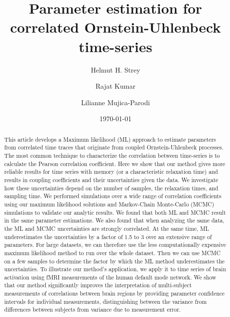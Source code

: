 \documentclass[%
 reprint,
 amsmath,amssymb,
 aps,
]{revtex4-1}
\begin{document}

\title{Parameter estimation for correlated Ornstein-Uhlenbeck time-series}

\author{Helmut H. Strey}
\author{Rajat Kumar}
\author{Lilianne Mujica-Parodi}

\date{\today}%

\begin{abstract}
This article develops a Maximum likelihood (ML) approach to estimate parameters from correlated time traces that originate from coupled Ornstein-Uhlenbeck processes.  The most common technique to characterize the correlation between time-series is to calculate the Pearson correlation coefficient.  Here we show that our method gives more reliable results for time series with memory (or a characteristic relaxation time) and results in coupling coefficients and their uncertainties given the data.  We investigate how these uncertainties depend on the number of samples, the relaxation times, and sampling time.  We performed simulations over a wide range of correlation coefficients using our maximum likelihood solutions and Markov-Chain Monte-Carlo (MCMC) simulations to validate our analytic results.  We found that both ML and MCMC result in the same parameter estimations.  We also found that when analyzing the same data, the ML and MCMC uncertainties are strongly correlated. At the same time, ML underestimates the uncertainties by a factor of 1.5 to 3 over an extensive range of parameters.  For large datasets, we can therefore use the less computationally expensive maximum likelihood method to run over the whole dataset. Then we can use MCMC on a few samples to determine the factor by which the ML method underestimates the uncertainties.  To illustrate our method's application, we apply it to time series of brain activation using fMRI measurements of the human default mode network.  We show that our method significantly improves the interpretation of multi-subject measurements of correlations between brain regions by providing parameter confidence intervals for individual measurements, distinguishing between the variance from differences between subjects from variance due to measurement error.
\end{abstract}
\end{document}
